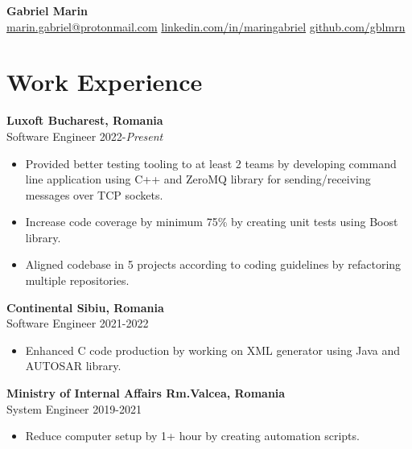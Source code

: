 \documentclass[a4paper,12pt]{article}
\begin{document}
\pagestyle{empty}

\begin{center}
\par {
    {\Huge \textbf{Gabriel Marin}}\\
}
\href{mailto:marin.gabriel@protonmail.com}{marin.gabriel@protonmail.com} \vrule\vspace{3mm}
\href{https://linkedin.com/in/maringabriel}{linkedin.com/in/maringabriel} \vrule\vspace{3mm}
\href{https://github.com/gblmrn}{github.com/gblmrn}
\vspace{-4mm}
\end{center}

\section{Work Experience}
\textbf{Luxoft \hfill Bucharest, Romania}\\
Software Engineer \hfill 2022-\emph{Present}
\vspace{-3mm}
\begin{itemize}[noitemsep, leftmargin=4mm]
\item Provided better testing tooling to at least 2 teams by developing command line application using C++ and ZeroMQ library for sending/receiving messages over TCP sockets.
\item Increase code coverage by minimum 75\% by creating unit tests using Boost library.
\item Aligned codebase in 5 projects according to coding guidelines by refactoring multiple repositories.
\end{itemize}
  
\textbf{Continental \hfill Sibiu, Romania}\\
Software Engineer \hfill 2021-2022
\vspace{-3mm}
\begin{itemize}[noitemsep, leftmargin=4mm]
\item Enhanced C code production by working on XML generator using Java and AUTOSAR library.
\end{itemize}

\textbf{Ministry of Internal Affairs \hfill Rm.Valcea, Romania}\\
System Engineer \hfill  2019-2021
\vspace{-3mm}
\begin{itemize}[noitemsep, leftmargin=4mm]
\item Reduce computer setup by 1+ hour by creating automation scripts.
\end{itemize}
  
\end{document}
